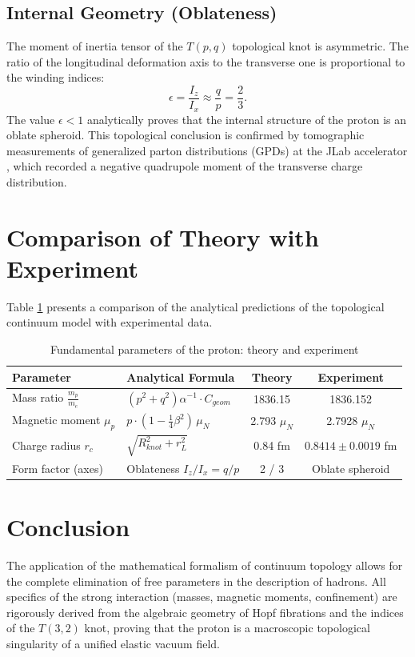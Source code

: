 \documentclass[12pt,a4paper]{article}
\begin{document}
	\subsection{Internal Geometry (Oblateness)}
	The moment of inertia tensor of the $T(p,q)$ topological knot is asymmetric. The ratio of the longitudinal deformation axis to the transverse one is proportional to the winding indices:
	\begin{equation}
		\epsilon = \frac{I_z}{I_x} \approx \frac{q}{p} = \frac{2}{3}.
	\end{equation}
	The value $\epsilon < 1$ analytically proves that the internal structure of the proton is an oblate spheroid. This topological conclusion is confirmed by tomographic measurements of generalized parton distributions (GPDs) at the JLab accelerator \cite{jlab_pressure}, which recorded a negative quadrupole moment of the transverse charge distribution.
	
	\section{Comparison of Theory with Experiment}
	
	Table \ref{tab:proton_params} presents a comparison of the analytical predictions of the topological continuum model with experimental data.
	
	\begin{table}[h]
		\centering
		\caption{Fundamental parameters of the proton: theory and experiment}
		\label{tab:proton_params}
		\renewcommand{\arraystretch}{1.4}
		\begin{tabular}{llcc}
			\toprule
			\textbf{Parameter} & \textbf{Analytical Formula} & \textbf{Theory} & \textbf{Experiment \cite{pdg2024, codata2018}} \\
			\midrule
			Mass ratio $\frac{m_p}{m_e}$ & $(p^2+q^2) \alpha^{-1} \cdot C_{geom}$ & 1836.15 & 1836.152 \\
			Magnetic moment $\mu_p$ & $p \cdot \left(1 - \frac{1}{4}\beta^2\right) \, \mu_N$ & 2.793 $\mu_N$ & 2.7928 $\mu_N$ \\
			Charge radius $r_c$ & $\sqrt{R_{knot}^2 + r_{L}^2}$ & 0.84 fm & $0.8414 \pm 0.0019$ fm \\
			Form factor (axes) & Oblateness $I_z / I_x = q/p$ & 2 / 3 & Oblate spheroid \cite{jlab_pressure} \\
			\bottomrule
		\end{tabular}
	\end{table}
	
	\section{Conclusion}
	The application of the mathematical formalism of continuum topology allows for the complete elimination of free parameters in the description of hadrons. All specifics of the strong interaction (masses, magnetic moments, confinement) are rigorously derived from the algebraic geometry of Hopf fibrations and the indices of the $T(3,2)$ knot, proving that the proton is a macroscopic topological singularity of a unified elastic vacuum field.
	
\end{document}
